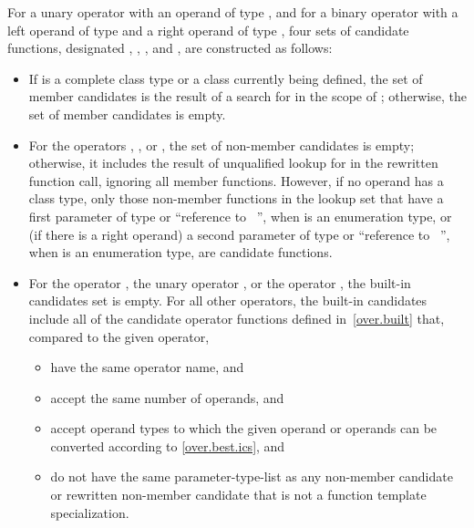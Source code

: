 \pnum
For a unary operator 
with an operand of type  ,
and for a binary operator 
with a left operand of type  
and a right operand of type  ,
four sets of candidate functions, designated
,
,
,
and
,
are constructed as follows:
\begin{itemize}
\item
If  is a complete class type or a class currently being defined,
the set of member candidates is the result of a search for
 in the scope of ;
otherwise, the set of member candidates is empty.
\item
For the operators \tcode{=}, \tcode{[]}, or \tcode{->},
the set of non-member candidates is empty;
otherwise, it includes the result of unqualified lookup for
in the rewritten function call,
ignoring all member functions.
However, if no operand has a class type, only those non-member
functions in the lookup set that have a first parameter of type
or ``reference to \cv{}~'',
when
is an enumeration type,
or (if there is a right operand) a second parameter of type
or ``reference to \cv{}~'',
when
is an enumeration type,
are candidate functions.
\item
For the operator
\tcode{,},
the unary operator
\tcode{\&},
or the operator
\tcode{->},
the built-in candidates set is empty.
For all other operators, the built-in candidates include all
of the candidate operator functions defined in~\ref{over.built} that,
compared to the given operator,
\begin{itemize}
\item
have the same operator name, and
\item
accept the same number of operands, and
\item
accept operand types to which the given operand or
operands can be converted according to \ref{over.best.ics}, and
\item
do not have the same parameter-type-list as any non-member candidate
or rewritten non-member candidate
that is not a function template specialization.
\end{itemize}


\end{itemize}
